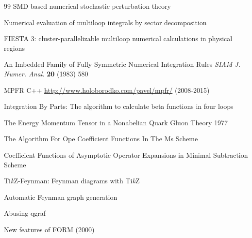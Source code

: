 \begin{thebibliography}{99}
  {SMD-based numerical stochastic perturbation theory}
  {}
  {}

  {Numerical evaluation of multiloop integrals by sector decomposition}
  {}
  {}

  {FIESTA 3: cluster-parallelizable multiloop numerical calculations in physical regions}
  {}
  {}

{An Imbedded Family of Fully Symmetric Numerical Integration Rules}
{{\it SIAM J. Numer. Anal.} {\bf 20} (1983) 580}
{}

{MPFR C++}
{\url{http://www.holoborodko.com/pavel/mpfr/} (2008-2015)}
{}

  {Integration By Parts: The algorithm to calculate beta functions in four loops}
  {}
  {}

  {The Energy Momentum Tensor in a Nonabelian Quark Gluon Theory}
  {1977}
  {}

  {The Algorithm For Ope Coefficient Functions In The Ms Scheme}
  {}
  {}

  {Coefficient Functions of Asymptotic Operator Expansions in Minimal
  Subtraction Scheme}
  {}
  {}

  {Ti\textit{k}Z-Feynman: Feynman diagrams with Ti\textit{k}Z}
  {}
  {}

  {Automatic Feynman graph generation}
  {}
  {}

  {Abusing qgraf}
  {}
  {}

  {New features of FORM}
  {(2000)}
  {}


\end{thebibliography}
